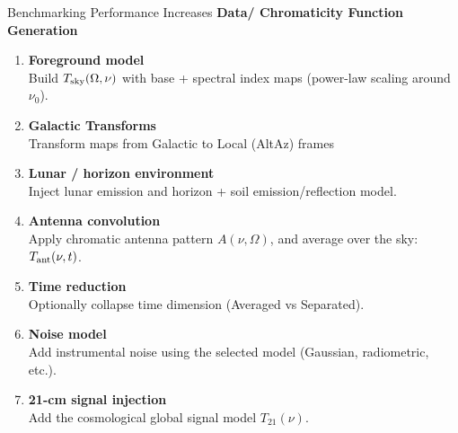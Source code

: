 \documentclass{beamer}
\begin{document}
\begin{frame}{Benchmarking Performance Increases}
\textbf{Data/ Chromaticity Function Generation}
\medskip
\scriptsize
\begin{enumerate}

  \item \textbf{Foreground model} \\
        Build $T_{\rm sky}(\Omega,\nu)$ with base + spectral index maps
        (power-law scaling around $\nu_0$).
        
  \item \textbf{Galactic Transforms} \\
        Transform maps from Galactic to Local (AltAz) frames

  \item \textbf{Lunar / horizon environment} \\
        Inject lunar emission and horizon + soil emission/reflection model.

  \item \textbf{Antenna convolution} \\
        Apply chromatic antenna pattern
        $A(\nu,\Omega)$, and average over the sky:
        $T_{\rm ant}(\nu,t)$.

  \item \textbf{Time reduction} \\
        Optionally collapse time dimension (Averaged vs Separated).

  \item \textbf{Noise model} \\
        Add instrumental noise using the selected
        model (Gaussian, radiometric, etc.).

  \item \textbf{21-cm signal injection} \\
        Add the cosmological global signal model $T_{21}(\nu)$.

\end{enumerate}
\end{frame}
\end{document}
